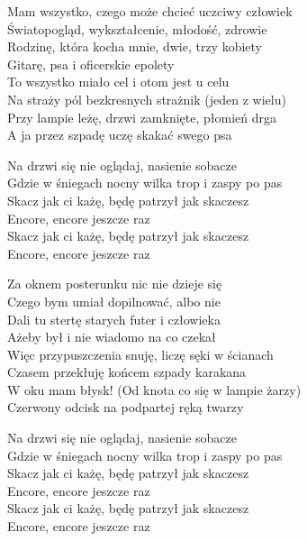 \begin{text}
    Mam wszystko, czego może chcieć uczciwy człowiek\\
    Światopogląd, wykształcenie, młodość, zdrowie\\
    Rodzinę, która kocha mnie, dwie, trzy kobiety\\
    Gitarę, psa i oficerskie epolety\\
    To wszystko miało cel i otom jest u celu\\
    Na straży pól bezkresnych strażnik (jeden z wielu)\\
    Przy lampie leżę, drzwi zamknięte, płomień drga\\
    A ja przez szpadę uczę skakać swego psa

    Na drzwi się nie oglądaj, nasienie sobacze\\
    Gdzie w śniegach nocny wilka trop i zaspy po pas\\
    Skacz jak ci każę, będę patrzył jak skaczesz\\
    Encore, encore jeszcze raz\\
    Skacz jak ci każę, będę patrzył jak skaczesz\\
    Encore, encore jeszcze raz

    Za oknem posterunku nic nie dzieje się\\
    Czego bym umiał dopilnować, albo nie\\
    Dali tu stertę starych futer i człowieka\\
    Ażeby był i nie wiadomo na co czekał\\
    Więc przypuszczenia snuję, liczę sęki w ścianach\\
    Czasem przekłuję końcem szpady karakana\\
    W oku mam błysk! (Od knota co się w lampie żarzy)\\
    Czerwony odcisk na podpartej ręką twarzy

    Na drzwi się nie oglądaj, nasienie sobacze\\
    Gdzie w śniegach nocny wilka trop i zaspy po pas\\
    Skacz jak ci każę, będę patrzył jak skaczesz\\
    Encore, encore jeszcze raz\\
    Skacz jak ci każę, będę patrzył jak skaczesz\\
    Encore, encore jeszcze raz


\end{text}
